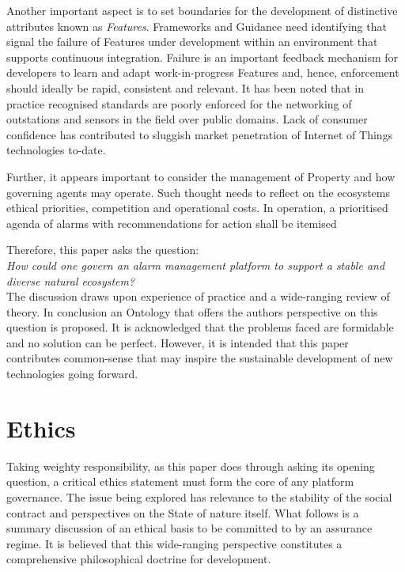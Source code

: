 \documentclass[11pt, oneside]{book}   	%
\begin{document}
Another important aspect is to set boundaries for the development of distinctive attributes known as \emph{Features}.
Frameworks and Guidance need identifying that signal the failure of Features under development within an environment that supports continuous integration.
Failure is an important feedback mechanism for developers to learn and adapt work-in-progress Features and, hence, enforcement should ideally be rapid, consistent and relevant.
It has been noted that in practice recognised standards are poorly enforced for the networking of outstations and sensors in the field over public domains.
Lack of consumer confidence has contributed to sluggish market penetration of Internet of Things technologies to-date.\

Further, it appears important to consider the management of Property and how governing agents may operate.
Such thought needs to reflect on the ecosystems ethical priorities, competition and operational costs.
In operation, a prioritised agenda of alarms with recommendations for action shall be itemised\

Therefore, this paper asks the question:\\

\emph{How could one govern an alarm management platform to support a stable and diverse natural ecosystem?}\\

The discussion draws upon experience of practice and a wide-ranging review of theory.
In conclusion an Ontology that offers the authors perspective on this question is proposed.
It is acknowledged that the problems faced are formidable and no solution can be perfect.
However, it is intended that this paper contributes common-sense that may inspire the sustainable development of new technologies going forward.\

\pagebreak

\chapter{Ethics}
Taking weighty responsibility, as this paper does through asking its opening question, a critical ethics statement must form the core of any platform governance.
The issue being explored has relevance to the stability of the social contract and perspectives on the State of nature itself.
What follows is a summary discussion of an ethical basis to be committed to by an assurance regime.
It is believed that this wide-ranging perspective constitutes a comprehensive philosophical doctrine for development.
\end{document}
